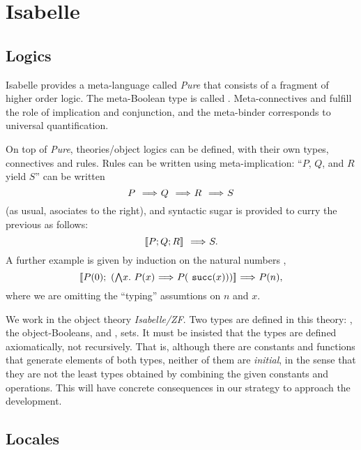 \section{Isabelle}

\subsection{Logics}

Isabelle provides a meta-language called \emph{Pure} that consists of
a fragment of higher order logic. The meta-Boolean type is called
. Meta-connectives
\isatt{\isasymLongrightarrow} and \isatt{\&\&\&} fulfill the role of
implication and conjunction, and the meta-binder \isatt{\isasymAnd}
corresponds to universal quantification. 

On top of \emph{Pure}, theories/object logics can be defined, with
their own types, connectives and rules. Rules can be written  using
meta-implication: ``$P$, $Q$, and $R$ yield $S$'' can be written
\[
P \ \isatt{\isasymLongrightarrow}\ Q\ \isatt{\isasymLongrightarrow}\ R\ \isatt{\isasymLongrightarrow}\ S
\]
(as usual,  \isatt{\isasymLongrightarrow} asociates to the right), and
syntactic sugar is provided to curry the previous as follows:
\[
\isasymlbrakk P; Q; R \isasymrbrakk \ \isatt{\isasymLongrightarrow}\ S.
\]
A further example is given by induction on the natural numbers
,
\[
\isasymlbrakk P(0);\ (\textstyle\isasymAnd
x.\ P(x)\ \isasymLongrightarrow\ P(\isatt{succ}(x))) \isasymrbrakk
\ \isasymLongrightarrow\ P(n), 
\]
where we are omitting the ``typing'' assumtions on $n$ and $x$.

We work in the object theory \emph{Isabelle/ZF}. Two types are defined
in this theory: \tyo, the object-Booleans, and \tyi,
sets. It must be insisted that the types are defined axiomatically, not
recursively. That is, although there are constants and functions that
generate elements of both types, neither of them are 
\emph{initial}, in the sense that they are not the least types
obtained by combining the given constants and operations. This will
have concrete consequences in our strategy to approach the development.

\subsection{Locales}


